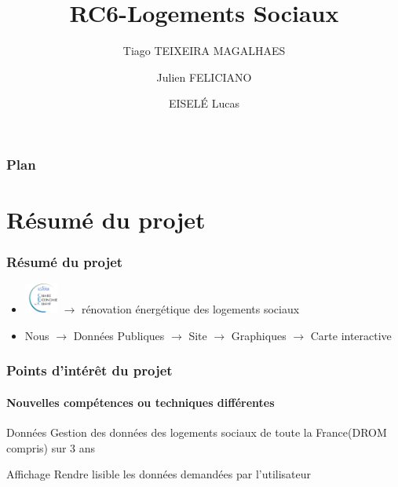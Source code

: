 \documentclass{beamer}
\title{RC6-Logements Sociaux}
\author{Tiago TEIXEIRA MAGALHAES \and Julien FELICIANO \and EISELÉ Lucas}
\institute[UCBL]
{
	Université Claude Bernard Lyon 1
}
\begin{document}
\maketitle


\begin{frame}%

\frametitle{Plan}
\tableofcontents

\end{frame}


\section{Résumé du projet}


\begin{frame} %
\frametitle{Résumé du projet}

	\begin{itemize} %
    \item \includegraphics[height=1cm]{Logo_Cec.jpg} $\rightarrow$ rénovation énergétique des logements sociaux
    \end{itemize}
    
    \medskip
    
    	\begin{itemize}%
    \item Nous $\rightarrow$ Données Publiques $\rightarrow$ Site $\rightarrow$ Graphiques $\rightarrow$ Carte interactive 
    \end{itemize}

\end{frame}


\begin{frame} %
\frametitle{Points d'intérêt du projet}
\framesubtitle{Nouvelles compétences ou techniques différentes}

	\begin{block}{Données}
	Gestion des données des logements sociaux de toute la France(DROM compris) sur 3 ans
	\end{block}
	
	\begin{block}{Affichage}
	Rendre lisible les données demandées par l'utilisateur
	\end{block}

\end{frame}
\end{document}
